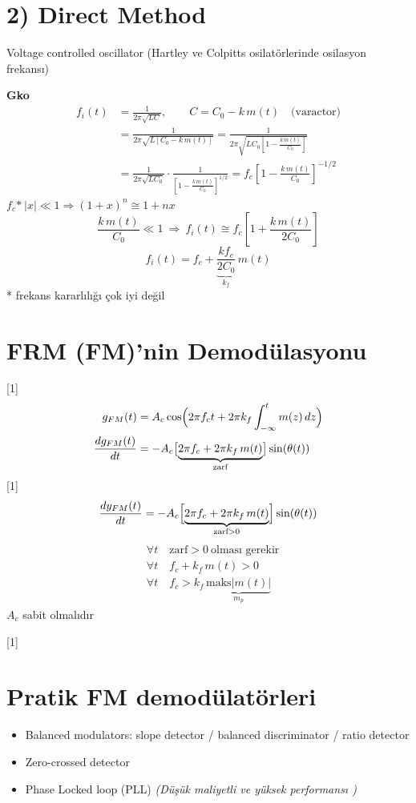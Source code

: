 \documentclass[11pt,a4paper]{article}
\begin{document}
\section{2) Direct Method}
Voltage controlled oscillator \quad (Hartley ve Colpitts osilatörlerinde osilasyon frekansı)

\textbf{Gko}
\begin{align*}
f_i(t)&=\frac{1}{2\pi\sqrt{LC}},\qquad C=C_0-k\,m(t)\quad\text{(varactor)}\\
&=\frac{1}{2\pi\sqrt{L[C_0-k\,m(t)]}}=\frac{1}{2\pi\sqrt{LC_0\left[1-\frac{k\,m(t)}{C_0}\right]}}\\
&=\frac{1}{2\pi\sqrt{LC_0}}\cdot\frac{1}{\left[1-\frac{k\,m(t)}{C_0}\right]^{1/2}}=f_c\left[1-\frac{k\,m(t)}{C_0}\right]^{-1/2}
\end{align*}
$f_c$\quad $*\ |x|\ll1\Rightarrow(1+x)^n\cong1+nx$
\[
\frac{k\,m(t)}{C_0}\ll1\ \Rightarrow\ f_i(t)\cong f_c\left[1+\frac{k\,m(t)}{2C_0}\right]
\]
\[
f_i(t)=f_c+\underbrace{\frac{k f_c}{2C_0}}_{k_f}\,m(t)
\]
* frekans kararlılığı çok iyi değil

\section{FRM (FM)'nin Demodülasyonu}
[1]
\begin{align*}
g_{FM}(t)&=A_c\cos\Bigl(2\pi f_c t+2\pi k_f\int_{-\infty}^{t}m(z)\,dz\Bigr)\\
\frac{dg_{FM}(t)}{dt}&=-A_c\bigl[\underbrace{2\pi f_c+2\pi k_f\,m(t)}_{\text{zarf}}\bigr]\sin(\theta(t))
\end{align*}
[1]
\[
\frac{dy_{FM}(t)}{dt}=-A_c\Bigl[\underbrace{2\pi f_c+2\pi k_f\,m(t)}_{\text{zarf}>0}\Bigr]\sin(\theta(t))
\]
\begin{align*}
&\forall t\quad \text{zarf}>0\ \text{olması gerekir}\\
&\forall t\quad f_c+k_f\,m(t)>0\\
&\forall t\quad f_c>k_f\,\underbrace{\mathrm{maks}|m(t)|}_{m_p}
\end{align*}
$A_c$ sabit olmalıdır

[1]

\section{Pratik FM demodülatörleri}
\begin{itemize}
\item Balanced modulators: slope detector / balanced discriminator / ratio detector
\item Zero-crossed detector
\item Phase Locked loop (PLL) \textit{(Düşük maliyetli ve yüksek performansı )}
\end{itemize}
\end{document}
